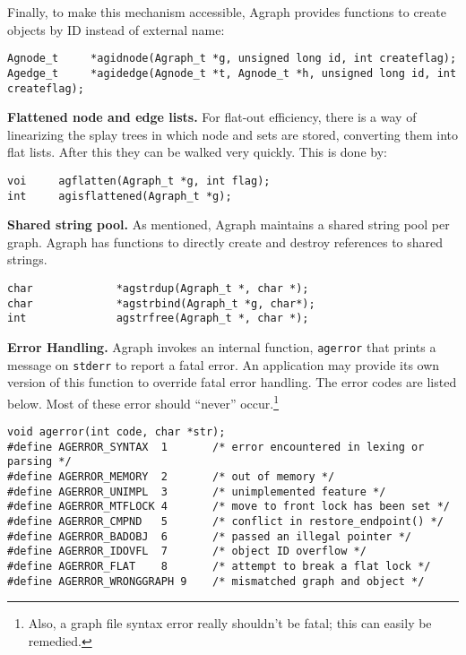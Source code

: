 \documentclass[11pt,letterpaper]{article}
\begin{document}
Finally, to make this mechanism accessible, Agraph provides functions
to create objects by ID instead of external name:

\begin{verbatim}
Agnode_t     *agidnode(Agraph_t *g, unsigned long id, int createflag);
Agedge_t     *agidedge(Agnode_t *t, Agnode_t *h, unsigned long id, int createflag);
\end{verbatim}

{\bf Flattened node and edge lists.}  For flat-out efficiency,
there is a way of linearizing the splay trees in which node
and sets are stored, converting them into flat lists.  After
this they can be walked very quickly.  This is done by:

\begin{verbatim}
voi     agflatten(Agraph_t *g, int flag);
int     agisflattened(Agraph_t *g);
\end{verbatim}

{\bf Shared string pool.}  As mentioned, Agraph maintains a
shared string pool per graph.  Agraph has functions to directly
create and destroy references to shared strings.

\begin{verbatim}
char             *agstrdup(Agraph_t *, char *);
char             *agstrbind(Agraph_t *g, char*);
int              agstrfree(Agraph_t *, char *);
\end{verbatim}

{\bf Error Handling.}  Agraph invokes an internal function, \verb"agerror"
that prints a message on \verb"stderr" to report a fatal error.  
An application may provide its own version of this function to
override fatal error handling.  The error codes are listed below.
Most of these error should ``never'' occur.\footnote{Also, a graph file
syntax error really shouldn't be fatal; this can easily be remedied.}

\begin{verbatim}
void agerror(int code, char *str);
#define AGERROR_SYNTAX  1       /* error encountered in lexing or parsing */
#define AGERROR_MEMORY  2       /* out of memory */
#define AGERROR_UNIMPL  3       /* unimplemented feature */
#define AGERROR_MTFLOCK 4       /* move to front lock has been set */
#define AGERROR_CMPND   5       /* conflict in restore_endpoint() */
#define AGERROR_BADOBJ  6       /* passed an illegal pointer */
#define AGERROR_IDOVFL  7       /* object ID overflow */
#define AGERROR_FLAT    8       /* attempt to break a flat lock */
#define AGERROR_WRONGGRAPH 9    /* mismatched graph and object */
\end{verbatim}
\end{document}
